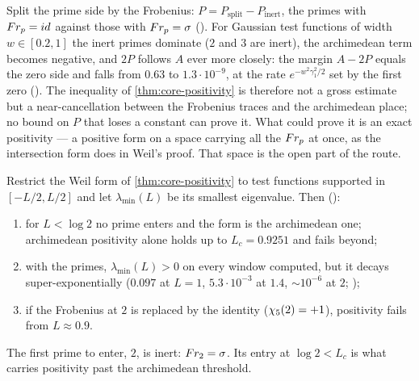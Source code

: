 \begin{remark}\label{rmk:saturation}
Split the prime side by the Frobenius: $P=P_{\mathrm{split}}-P_{\mathrm{inert}}$,
the primes with $Fr_p=id$ against those with $Fr_p=\sigma$
().  For Gaussian test
functions of width $w\in[0.2,1]$ the inert primes dominate ($2$ and $3$
are inert), the archimedean term becomes negative, and $2P$ follows $A$ ever
more closely: the margin $A-2P$ equals the zero side and falls from $0.63$ to
$1.3\cdot10^{-9}$, at the rate $e^{-w^2\gamma_1^2/2}$ set by the first zero
().  The inequality of \cref{thm:core-positivity} is therefore not a gross
estimate but a near-cancellation between the Frobenius traces and the
archimedean place; no bound on $P$ that loses a constant can prove it.  What
could prove it is an exact positivity --- a positive form on a space carrying
all the $Fr_p$ at once, as the intersection form does in Weil's proof.
That space is the open part of the route.
\end{remark}





\begin{proposition}\label{prop:semilocal}
Restrict the Weil form of \cref{thm:core-positivity} to test functions
supported in $[-L/2,L/2]$ and let $\lambda_{\min}(L)$ be its smallest
eigenvalue.  Then ():
\begin{enumerate}
  \item for $L<\log2$ no prime enters and the form is the archimedean one;
    archimedean positivity alone holds up to $L_c=0.9251$ and fails beyond;
  \item with the primes, $\lambda_{\min}(L)>0$ on every window computed, but it
    decays super-exponentially ($0.097$ at $L=1$, $5.3\cdot10^{-3}$ at $1.4$,
    $\sim10^{-6}$ at $2$; );
  \item if the Frobenius at $2$ is replaced by the identity ($\chi_5(2)=+1$),
    positivity fails from $L\approx0.9$.
\end{enumerate}
The first prime to enter, $2$, is inert: $Fr_2=\sigma$.  Its entry at
$\log2<L_c$ is what carries positivity past the archimedean threshold.
\end{proposition}

